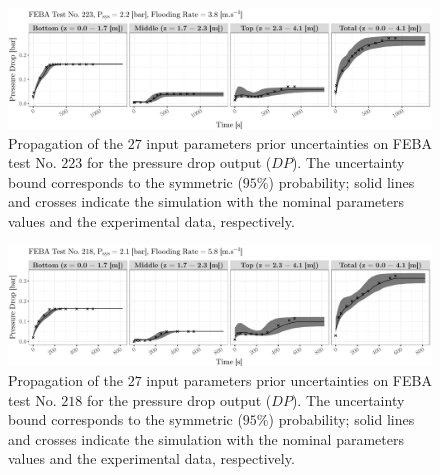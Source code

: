 \begin{figure}[!h]
    \centering
    \includegraphics[width=1.0\textwidth]{../figures/chapter2/figures/plotTraceUQPriorDP223}
    \caption[Propagation of the $27$ input parameters prior uncertainties on FEBA test No. $223$ for the pressure drop output ($DP$).]{Propagation of the $27$ input parameters prior uncertainties on FEBA test No. $223$ for the pressure drop output ($DP$). The uncertainty bound corresponds to the symmetric ($95\%$) probability; solid lines and crosses indicate the simulation with the nominal parameters values and the experimental data, respectively.}
    \label{fig:ch2_plot_trace_uq_prior_dp_223}
\end{figure}

\clearpage

\begin{figure}[bth]
    \centering
    \includegraphics[width=1.0\textwidth]{../figures/chapter2/figures/plotTraceUQPriorDP218}
    \caption[Propagation of the $27$ input parameters prior uncertainties on FEBA test No. $218$ for the pressure drop output ($DP$).]{Propagation of the $27$ input parameters prior uncertainties on FEBA test No. $218$ for the pressure drop output ($DP$). The uncertainty bound corresponds to the symmetric ($95\%$) probability; solid lines and crosses indicate the simulation with the nominal parameters values and the experimental data, respectively.}
    \label{fig:ch2_plot_trace_uq_prior_dp_218}
\end{figure}

